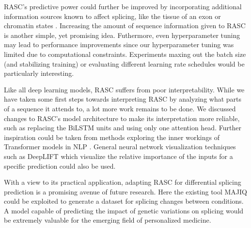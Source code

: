 RASC's predictive power could further be improved by incorporating additional information sources known to affect splicing, like the tissue of an exon or chromatin states \cite{chromatin}. Increasing the amount of sequence information given to RASC is another simple, yet promising idea. 
Futhermore, even hyperparameter tuning may lead to performance improvements since our hyperparameter tuning was limited due to computational constraints. Experiments maxing out the batch size (and stabilizing training) or evaluating different learning rate schedules would be particularly interesting. 


Like all deep learning models, RASC suffers from poor interpretability. While we have taken some first steps towards interpreting RASC by analyzing what parts of a sequence it attends to, a lot more work remains to be done. We discussed changes to RASC's model architecture to make its interpretation more reliable, such as replacing the BiLSTM units and using only one attention head. Further inspiration could be taken from methods exploring the inner workings of Transformer models in NLP \cite{interpretingbert}. General neural network visualization techniques such as DeepLIFT \cite{deeplift} which visualize the relative importance of the inputs for a specific prediction could also be used.
%

With a view to its practical application, adapting RASC for differential splicing prediction is a promising avenue of future research. Here the existing tool MAJIQ could be exploited to generate a dataset for splicing changes between conditions. A model capable of predicting the impact of genetic variations on splicing would be extremely valuable for the emerging field of personalized medicine.




%
%
% 
%
%
